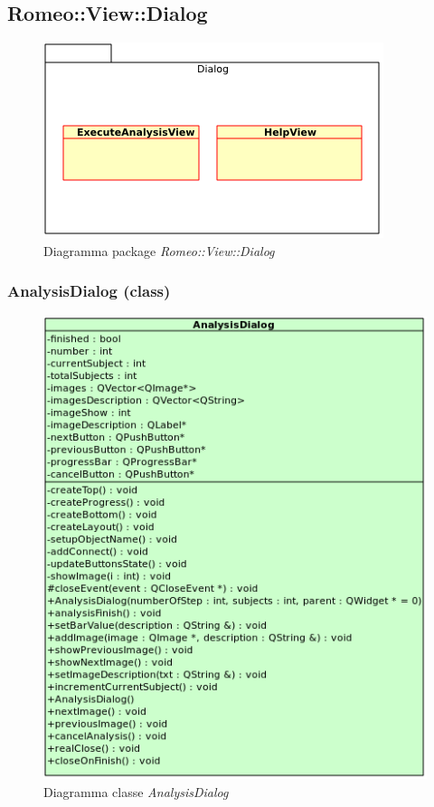 \subsection{Romeo::View::Dialog}
	\begin{figure} [!h]
		\centering
		\includegraphics[scale=0.5] {./Content/Immagini/Romeo__View__Dialog.png}
		\caption{Diagramma package \textsl{Romeo::View::Dialog}}
	\end{figure}
	\subsubsection{AnalysisDialog (class)}
	\begin{figure}[!h]
		\centering
		\includegraphics[scale=2.75]{./Content/Immagini/view/AnalysisDialog}
		\caption{Diagramma classe \textsl{AnalysisDialog}}
	\end{figure}
